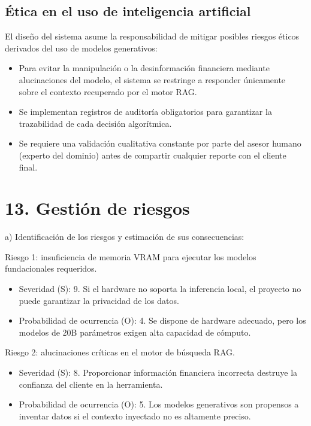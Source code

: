 \documentclass[
11pt, %
]{charter}
\begin{document}
\subsection{Ética en el uso de inteligencia artificial}
El diseño del sistema asume la responsabilidad de mitigar posibles riesgos éticos derivados del uso de modelos generativos:
\begin{itemize}
  \item Para evitar la manipulación o la desinformación financiera mediante alucinaciones del modelo, el sistema se restringe a responder únicamente sobre el contexto recuperado por el motor RAG.
  \item Se implementan registros de auditoría obligatorios para garantizar la trazabilidad de cada decisión algorítmica.
  \item Se requiere una validación cualitativa constante por parte del asesor humano (experto del dominio) antes de compartir cualquier reporte con el cliente final.
\end{itemize}


\section{13. Gestión de riesgos}
\label{sec:riesgos}

a) Identificación de los riesgos y estimación de sus consecuencias:
 
Riesgo 1: insuficiencia de memoria VRAM para ejecutar los modelos fundacionales requeridos.
\begin{itemize}
	\item Severidad (S): 9. Si el hardware no soporta la inferencia local, el proyecto no puede garantizar la privacidad de los datos.
	\item Probabilidad de ocurrencia (O): 4. Se dispone de hardware adecuado, pero los modelos de 20B parámetros exigen alta capacidad de cómputo.
\end{itemize}   

Riesgo 2: alucinaciones críticas en el motor de búsqueda RAG.
\begin{itemize}
	\item Severidad (S): 8. Proporcionar información financiera incorrecta destruye la confianza del cliente en la herramienta.
	\item Probabilidad de ocurrencia (O): 5. Los modelos generativos son propensos a inventar datos si el contexto inyectado no es altamente preciso.
\end{itemize}
\end{document}
